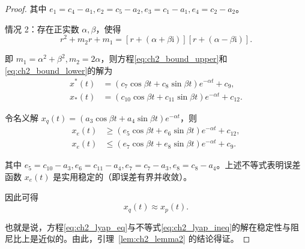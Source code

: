 \begin{proof}
其中 $e_1=c_4-a_1,e_2=c_5-a_2,e_3=c_1-a_1,e_4=c_2-a_2$。

情况 2：存在正实数 $\alpha,\beta$，使得
\begin{equation}\label{eq:ch2_bound_case2_char}
r^2+m_2r+m_1=\left[r+(\alpha+\beta\mathrm{i})\right]\left[r+(\alpha-\beta\mathrm{i})\right].
\end{equation}

即 $m_1=\alpha^2+\beta^2,m_2=2\alpha$，则方程\eqref{eq:ch2_bound_upper}和\eqref{eq:ch2_bound_lower}的解为
\begin{subequations}\label{eq:ch2_bound_case2_sol}
\begin{align}
x^*(t)&=(c_7\cos\beta t+c_8\sin\beta t)e^{-\alpha t}+c_9,\\
x_*(t)&=(c_{10}\cos\beta t+c_{11}\sin\beta t)e^{-\alpha t}+c_{12}.
\end{align}
\end{subequations}

令名义解 $x_q(t)=(a_3\cos\beta t+a_4\sin\beta t)e^{-\alpha t}$，则
\begin{subequations}\label{eq:ch2_bound_case2_err}
\begin{align}
x_e(t)&\ge (e_5\cos\beta t+e_6\sin\beta t)e^{-\alpha t}+c_{12},\\
x_e(t)&\le (e_7\cos\beta t+e_8\sin\beta t)e^{-\alpha t}+c_9.
\end{align}
\end{subequations}

其中 $e_5=c_{10}-a_3,e_6=c_{11}-a_4,e_7=c_7-a_3,e_8=c_8-a_4$。上述不等式表明误差函数 $x_e(t)$ 是实用稳定的（即误差有界并收敛）。

因此可得
\begin{equation}\label{eq:ch2_xq_xp}
x_q(t)\approx x_p(t).
\end{equation}

也就是说，方程\eqref{eq:ch2_lyap_eq}与不等式\eqref{eq:ch2_lyap_ineq}的解在稳定性与阻尼比上是近似的。由此，引理~\ref{lem:ch2_lemma2} 的结论得证。
\end{proof}


